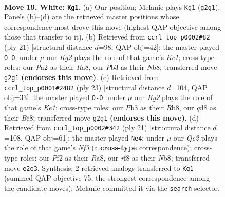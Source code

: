 \documentclass[11pt]{article}
\begin{document}
\clearpage

\begin{figure}[p]\centering
\begin{subfigure}{0.46\textwidth}\centering
\resizebox{\linewidth}{!}{%
\newchessgame
\chessboard[
  setfen={2rq1r2/4bp1k/2n2np1/p6p/1p1p4/1P1P1NP1/PBR1QPKP/RN6 w - - 6 19},
  showmover=false,
  pgfstyle=straightmove, color=movearrow, markmove={g2-g1}
]}
\caption{}
\end{subfigure}\hfill
\begin{subfigure}{0.46\textwidth}\centering
\resizebox{\linewidth}{!}{%
\newchessgame
\chessboard[
  setfen={rn1qk2r/1pp1ppbp/1n4p1/4Pb2/p2P4/2P2N2/PP2B1PP/RNBQ1RK1 b kq - 1 11},
  showmover=false,
  pgfstyle=straightmove, color=movearrow, markmove={e8-g8}
]}
\caption{}
\end{subfigure}
\\[4pt]
\begin{subfigure}{0.46\textwidth}\centering
\resizebox{\linewidth}{!}{%
\newchessgame
\chessboard[
  setfen={1rb1k2r/p2nppbp/6p1/q1pP3n/2p1P3/2N2N2/PP2BPP1/R1BQ1RK1 b k - 6 12},
  showmover=false,
  pgfstyle=straightmove, color=movearrow, markmove={e8-g8}
]}
\caption{}
\end{subfigure}\hfill
\begin{subfigure}{0.46\textwidth}\centering
\resizebox{\linewidth}{!}{%
\newchessgame
\chessboard[
  setfen={rn1qr1k1/pp3pbp/3p1np1/2pP1b2/2P5/2N2N1P/PP2BPP1/R1BQR1K1 b - - 2 11},
  showmover=false,
  pgfstyle=straightmove, color=movearrow, markmove={f6-e4}
]}
\caption{}
\end{subfigure}
\caption{\textbf{Move 19, White: \texttt{Kg1}.} (a) Our position; Melanie plays \texttt{Kg1} (\texttt{g2g1}). Panels (b)--(d) are the retrieved master positions whose correspondence most drove this move (highest QAP objective among those that transfer to it). (b) Retrieved from \texttt{ccrl\_top\_p0002\#82} (ply 21) [structural distance $d$=98, QAP obj=42]: the master played \texttt{O-O}; under $\mu$ our \emph{Kg2} plays the role of that game's \emph{Ke1}; cross-type roles: our \emph{P}a2 as their \emph{R}a8, our \emph{P}b3 as their \emph{N}b8; transferred move \texttt{g2g1} \textbf{(endorses this move)}. (c) Retrieved from \texttt{ccrl\_top\_p0001\#2482} (ply 23) [structural distance $d$=104, QAP obj=33]: the master played \texttt{O-O}; under $\mu$ our \emph{Kg2} plays the role of that game's \emph{Ke1}; cross-type roles: our \emph{P}b3 as their \emph{R}b8, our \emph{q}d8 as their \emph{B}c8; transferred move \texttt{g2g1} \textbf{(endorses this move)}. (d) Retrieved from \texttt{ccrl\_top\_p0002\#342} (ply 21) [structural distance $d$=108, QAP obj=61]: the master played \texttt{Ne4}; under $\mu$ our \emph{Qe2} plays the role of that game's \emph{Nf3} (a \textbf{cross-type} correspondence); cross-type roles: our \emph{P}f2 as their \emph{R}a8, our \emph{r}f8 as their \emph{N}b8; transferred move \texttt{e2e3}. Synthesis: 2 retrieved analogs transferred to \texttt{Kg1} (summed QAP objective 75, the strongest correspondence among the candidate moves); Melanie committed it via the \texttt{search} selector.}
\label{fig:thought-m36}
\end{figure}
\end{document}
